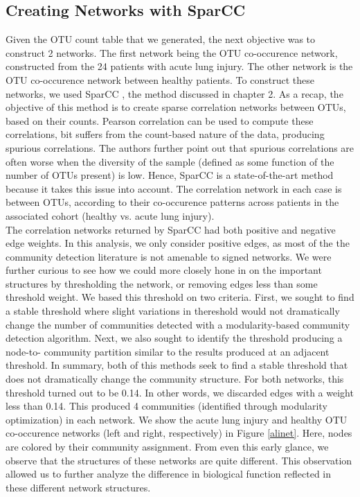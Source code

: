 \subsection{Creating Networks with SparCC}
\indent Given the OTU count table that we generated, the next objective was to construct 2 networks. The first network being the OTU co-occurence network, constructed from the 24 patients with acute lung injury. The other network is the OTU co-occurence network between healthy patients. To construct these networks, we used SparCC \cite{sparcc}, the method discussed in chapter 2. As a recap, the objective of this method is to create sparse correlation networks between OTUs, based on their counts. Pearson correlation can be used to compute these correlations, bit suffers from the count-based nature of the data, producing spurious correlations. The authors further point out that spurious correlations are often worse when the diversity of the sample (defined as some function of the number of OTUs present) is low. Hence, SparCC is a state-of-the-art method because it takes this issue into account. The correlation network in each case  is between OTUs, according to their co-occurence patterns across patients in the associated cohort (healthy vs. acute lung injury). \\
\indent The correlation networks returned by SparCC had both positive and negative edge weights. In this analysis, we only consider positive edges, as most of the the community detection literature is not amenable to signed networks. We were further curious to see how we could more closely hone in on the important structures by thresholding the network, or removing edges less than some threshold weight. We based this threshold on two criteria. First, we sought to find a stable threshold where slight variations in thereshold would not dramatically change the number of communities detected with a modularity-based community detection algorithm. Next, we also sought to identify the threshold producing a node-to- community partition similar to the results produced at an adjacent threshold. In summary, both of this methods seek to find a stable threshold that does not dramatically change the community structure. For both networks, this threshold turned out to be 0.14. In other words, we discarded edges with a weight less than 0.14. This produced 4 communities (identified through modularity optimization) in each network. We show the acute lung injury and healthy OTU co-occurence networks  (left and right, respectively) in Figure \ref{alinet}. Here, nodes are colored by their community assignment. From even this early glance, we observe that the structures of these networks are quite different. This observation allowed us to further analyze the difference in biological function reflected in these different network structures.  


